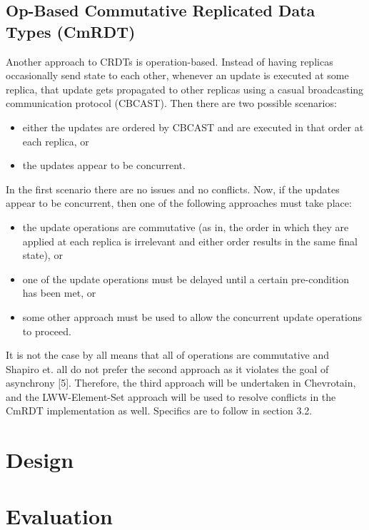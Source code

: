 \documentclass[11pt]{article}
\begin{document}
\subsection{Op-Based Commutative Replicated Data Types (CmRDT)}
Another approach to CRDTs is operation-based. Instead of having replicas occasionally send state to each other, whenever an update is executed at some replica, that update gets propagated to other replicas using a casual broadcasting communication protocol (CBCAST). Then there are two possible scenarios:
\begin{itemize}
\item either the updates are ordered by CBCAST and are executed in that order at each replica, or
\item the updates appear to be concurrent.
\end{itemize}

In the first scenario there are no issues and no conflicts. Now, if the updates appear to be concurrent, then one of the following approaches must take place:
\begin{itemize}
 \item the update operations are commutative (as in, the order in which they are applied at each replica is irrelevant and either order results in the same final state), or
 \item one of the update operations must be delayed until a certain pre-condition has been met, or
 \item some other approach must be used to allow the concurrent update operations to proceed.
\end{itemize}

It is not the case by all means that all of operations are commutative and Shapiro et. all do not prefer the second approach as it violates the goal of asynchrony [5]. Therefore, the third approach will be undertaken in Chevrotain, and the LWW-Element-Set approach will be used to resolve conflicts in the CmRDT implementation as well. Specifics are to follow in section 3.2.

\newpage
\section{Design} %

\newpage
\section{Evaluation}
\end{document}
